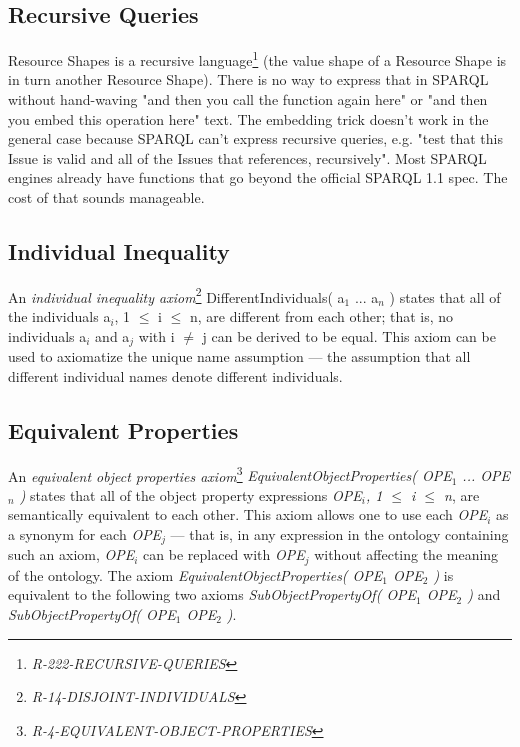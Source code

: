 \documentclass{llncs}
\begin{document}
\subsection{Recursive Queries}

Resource Shapes is a recursive language\footnote{\emph{R-222-RECURSIVE-QUERIES}} (the value shape of a Resource Shape is in turn another Resource Shape). 
There is no way to express that in SPARQL without hand-waving "and then you call the function again here" or "and then you embed this operation here" text.  
The embedding trick doesn't work
in the general case because SPARQL can't express recursive queries,
e.g. "test that this Issue is valid and all of the Issues that references, recursively".
Most SPARQL engines already have
functions that go beyond the official SPARQL 1.1 spec. 
The cost of that sounds manageable.

\subsection{Individual Inequality}

An \emph{individual inequality axiom}\footnote{\emph{R-14-DISJOINT-INDIVIDUALS}} DifferentIndividuals( a$_1$ ... a$_n$ ) states that all of the individuals a$_i$, 1 $\leq$ i $\leq$ n, are different from each other; 
that is, no individuals a$_i$ and a$_j$ with i $\neq$ j can be derived to be equal. 
This axiom can be used to axiomatize the unique name assumption — the assumption that all different individual names denote different individuals. 

\subsection{Equivalent Properties}

An \emph{equivalent object properties axiom}\footnote{\emph{R-4-EQUIVALENT-OBJECT-PROPERTIES}} \emph{EquivalentObjectProperties( OPE$_1$ ... OPE$_n$ )} states that all of the object property expressions \emph{OPE$_i$, 1 $\leq$ i $\leq$ n}, are semantically equivalent to each other. This axiom allows one to use each \emph{OPE$_i$} as a synonym for each \emph{OPE$_j$} — that is, in any expression in the ontology containing such an axiom, \emph{OPE$_i$} can be replaced with \emph{OPE$_j$} without affecting the meaning of the ontology. The axiom \emph{EquivalentObjectProperties( OPE$_1$ OPE$_2$ )} is equivalent to the following two axioms \emph{SubObjectPropertyOf( OPE$_1$ OPE$_2$ )} and \emph{SubObjectPropertyOf( OPE$_1$ OPE$_2$ )}.
\end{document}
